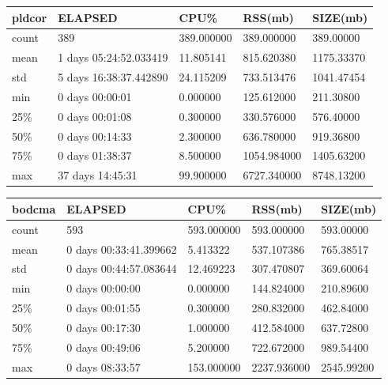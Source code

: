 \documentclass{article}
\begin{document}
\begin{tabular}{|l|l|l|l|l|}
\hline 
\hline pldcor& ELAPSED&   CPU\%&  RSS(mb)&   SIZE(mb) \\
\hline count&    389& 389.000000&  389.000000&  389.00000 \\
\hline mean&  1 days 05:24:52.033419&  11.805141&  815.620380& 1175.33370 \\
\hline std&  5 days 16:38:37.442890&  24.115209&  733.513476& 1041.47454 \\
\hline min&   0 days 00:00:01&  0.000000&  125.612000&  211.30800 \\
\hline 25\%&   0 days 00:01:08&  0.300000&  330.576000&  576.40000 \\
\hline 50\%&   0 days 00:14:33&  2.300000&  636.780000&  919.36800 \\
\hline 75\%&   0 days 01:38:37&  8.500000& 1054.984000& 1405.63200 \\
\hline max&  37 days 14:45:31&  99.900000& 6727.340000& 8748.13200 \\
\hline 
\end{tabular}
 
\begin{tabular}{|l|l|l|l|l|}
\hline 
\hline bodcma& ELAPSED&   CPU\%&  RSS(mb)&   SIZE(mb) \\
\hline count&    593& 593.000000&  593.000000&  593.00000 \\
\hline mean&  0 days 00:33:41.399662&  5.413322&  537.107386&  765.38517 \\
\hline std&  0 days 00:44:57.083644&  12.469223&  307.470807&  369.60064 \\
\hline min&   0 days 00:00:00&  0.000000&  144.824000&  210.89600 \\
\hline 25\%&   0 days 00:01:55&  0.300000&  280.832000&  462.84000 \\
\hline 50\%&   0 days 00:17:30&  1.000000&  412.584000&  637.72800 \\
\hline 75\%&   0 days 00:49:06&  5.200000&  722.672000&  989.54400 \\
\hline max&   0 days 08:33:57& 153.000000& 2237.936000& 2545.99200 \\
\hline 
\end{tabular}
 
\end{document}
